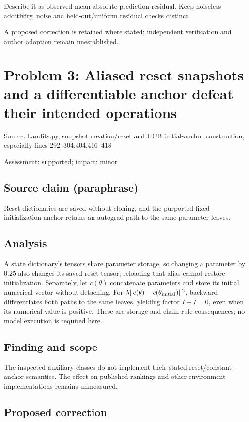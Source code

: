 \documentclass[11pt]{article}
\begin{document}
Describe it as observed mean absolute prediction residual. Keep noiseless additivity, noise and held-out/uniform residual checks distinct.

A proposed correction is retained where stated; independent verification and author adoption remain unestablished.

\section*{Problem 3: Aliased reset snapshots and a differentiable anchor defeat their intended operations}

Source: bandits.py, snapshot creation/reset and UCB initial-anchor construction, especially lines 292–304,404,416–418

Assessment: supported; impact: minor

\subsection*{Source claim (paraphrase)}

Reset dictionaries are saved without cloning, and the purported fixed initialization anchor retains an autograd path to the same parameter leaves.

\subsection*{Analysis}

A state dictionary’s tensors share parameter storage, so changing a parameter by \(0.25\) also changes its saved reset tensor; reloading that alias cannot restore initialization. Separately, let \(c(\theta)\) concatenate parameters and store its initial numerical vector without detaching. For \(\lambda\|c(\theta)-c(\theta_{\rm initial})\|^2\), backward differentiates both paths to the same leaves, yielding factor \(I-I=0\), even when its numerical value is positive. These are storage and chain-rule consequences; no model execution is required here.

\subsection*{Finding and scope}

The inspected auxiliary classes do not implement their stated reset/constant-anchor semantics. The effect on published rankings and other environment implementations remains unmeasured.

\subsection*{Proposed correction}
\end{document}

